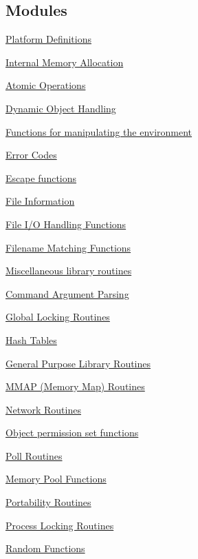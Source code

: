 \subsection*{Modules}
\begin{DoxyCompactItemize}
\item 
\hyperlink{group__apr__platform}{Platform Definitions}
\item 
\hyperlink{group__apr__allocator}{Internal Memory Allocation}
\item 
\hyperlink{group__apr__atomic}{Atomic Operations}
\item 
\hyperlink{group__apr__dso}{Dynamic Object Handling}
\item 
\hyperlink{group__apr__env}{Functions for manipulating the environment}
\item 
\hyperlink{group__apr__errno}{Error Codes}
\item 
\hyperlink{group__APR__Util__Escaping}{Escape functions}
\item 
\hyperlink{group__apr__file__info}{File Information}
\item 
\hyperlink{group__apr__file__io}{File I/\+O Handling Functions}
\item 
\hyperlink{group__apr__fnmatch}{Filename Matching Functions}
\item 
\hyperlink{group__apr__general}{Miscellaneous library routines}
\item 
\hyperlink{group__apr__getopt}{Command Argument Parsing}
\item 
\hyperlink{group__APR__GlobalMutex}{Global Locking Routines}
\item 
\hyperlink{group__apr__hash}{Hash Tables}
\item 
\hyperlink{group__apr__lib}{General Purpose Library Routines}
\item 
\hyperlink{group__apr__mmap}{M\+M\+A\+P (\+Memory Map) Routines}
\item 
\hyperlink{group__apr__network__io}{Network Routines}
\item 
\hyperlink{group__apr__perms__set}{Object permission set functions}
\item 
\hyperlink{group__apr__poll}{Poll Routines}
\item 
\hyperlink{group__apr__pools}{Memory Pool Functions}
\item 
\hyperlink{group__apr__portabile}{Portability Routines}
\item 
\hyperlink{group__apr__proc__mutex}{Process Locking Routines}
\item 
\hyperlink{group__apr__random}{Random Functions}

\end{DoxyCompactItemize}
